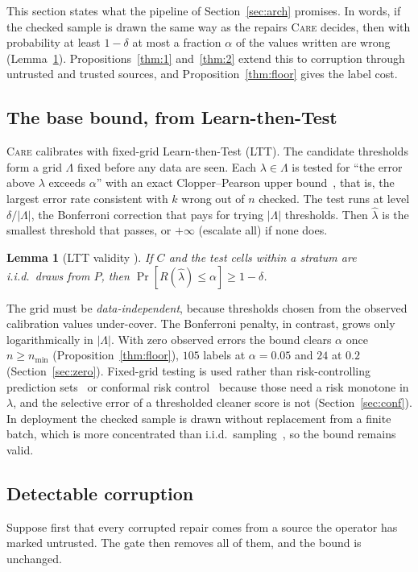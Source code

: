 \documentclass[sigconf, nonacm, balance=false]{acmart}
\newtheorem{lemma}{Lemma}
\theoremstyle{remark}
\begin{document}
This section states what the pipeline of Section~\ref{sec:arch} promises. In words, if
the checked sample is drawn the same way as the repairs \textsc{Care} decides, then
with probability at least $1-\delta$ at most a fraction $\alpha$ of the values written
are wrong (Lemma~\ref{lem:ltt}). Propositions~\ref{thm:1} and~\ref{thm:2} extend this
to corruption through untrusted and trusted sources, and Proposition~\ref{thm:floor}
gives the label cost.

\subsection{The base bound, from Learn-then-Test}
\textsc{Care} calibrates with fixed-grid Learn-then-Test (LTT). The candidate
thresholds form a grid $\Lambda$ fixed before any data are seen. Each
$\lambda\in\Lambda$ is tested for ``the error above $\lambda$ exceeds $\alpha$'' with
an exact Clopper--Pearson upper bound~\cite{10.1093/biomet/26.4.404}, that is, the
largest error rate consistent with $k$ wrong out of $n$ checked. The test runs at level
$\delta/|\Lambda|$, the Bonferroni correction that pays for trying $|\Lambda|$
thresholds. Then $\hat\lambda$ is the smallest threshold that passes, or $+\infty$
(escalate all) if none does.

\begin{lemma}[LTT validity \cite{10.1214/24-AOAS1998}]
\label{lem:ltt}
If $C$ and the test cells within a stratum are i.i.d.\ draws from $P$, then
$\Pr[R(\hat\lambda)\le\alpha]\ge 1-\delta$.
\end{lemma}

The grid must be \emph{data-independent}, because thresholds chosen from the observed
calibration values under-cover. The Bonferroni penalty, in contrast, grows only
logarithmically in $|\Lambda|$. With zero observed errors the bound clears $\alpha$
once $n\ge n_{\min}$ (Proposition~\ref{thm:floor}), $105$ labels at $\alpha=0.05$ and
$24$ at $0.2$ (Section~\ref{sec:zero}). Fixed-grid
testing is used rather than risk-controlling prediction sets~\cite{10.1145/3478535} or
conformal risk control~\cite{angelopoulos2024crc} because those need a risk monotone in
$\lambda$, and the selective error of a thresholded cleaner score is not
(Section~\ref{sec:conf}).
In deployment the checked sample is drawn without replacement from a finite batch,
which is more concentrated than i.i.d.\ sampling~\cite{hoeffding1963}, so the bound
remains valid.

\subsection{Detectable corruption}
Suppose first that every corrupted repair comes from a source the operator has marked
untrusted. The gate then removes all of them, and the bound is unchanged.
\end{document}
